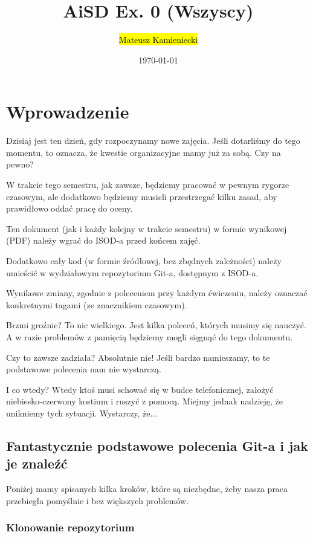\documentclass[twoside]{article}
\title{AiSD Ex. 0 (Wszyscy)}
\author{\hl{Mateusz Kamieniecki}}
\date{\today}
\begin{document}
\pagestyle{fancy}
\fancyhead{}
\fancyhead[L]{\@title}
\fancyhead[R]{\@author}
\fancyhead[C]{\@date}

\cfoot{\thepage\ / \pageref{LastPage}}


\newpage

\section{Wprowadzenie}

Dzisiaj jest ten dzień, gdy rozpoczynamy nowe zajęcia.
Jeśli dotarliśmy do tego momentu, to oznacza, że kwestie organizacyjne mamy już za sobą.
Czy na pewno?

W trakcie tego semestru, jak zawsze, będziemy pracować w pewnym rygorze czasowym, ale dodatkowo
będziemy musieli przestrzegać kilku zasad, aby prawidłowo oddać pracę do oceny.

Ten dokument (jak i każdy kolejny w trakcie semestru) w formie wynikowej (PDF) należy wgrać 
do ISOD-a przed końcem zajęć.

Dodatkowo cały kod (w formie źródłowej, bez zbędnych zależności) należy umieścić w wydziałowym repozytorium Git-a, dostępnym z ISOD-a.

Wynikowe zmiany, zgodnie z poleceniem przy każdym ćwiczeniu, należy oznaczać konkretnymi tagami
(ze znacznikiem czasowym).

Brzmi groźnie?
To nic wielkiego.
Jest kilka poleceń, których musimy się nauczyć. 
A w razie problemów z pamięcią będziemy mogli sięgnąć do tego dokumentu.

Czy to zawsze zadziała?
Absolutnie nie!
Jeśli bardzo namieszamy, to te podstawowe polecenia nam nie wystarczą.

I co wtedy?
Wtedy ktoś musi schować się w budce telefonicznej, założyć niebiesko-czerwony kostium i ruszyć
z pomocą.
Miejmy jednak nadzieję, że unikniemy tych sytuacji.
Wystarczy, że...

\subsection{Fantastycznie podstawowe polecenia Git-a i jak je znaleźć}

Poniżej mamy spisanych kilka kroków, które są niezbędne, żeby nasza praca przebiegła pomyślnie i bez większych problemów.

\subsubsection{Klonowanie repozytorium}
\end{document}
